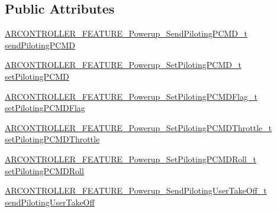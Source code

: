 \subsection*{Public Attributes}
\begin{DoxyCompactItemize}
\item 
\hyperlink{_a_r_c_o_n_t_r_o_l_l_e_r___feature_8h_aedb574521a68246ff02c53d5b0cec072}{A\+R\+C\+O\+N\+T\+R\+O\+L\+L\+E\+R\+\_\+\+F\+E\+A\+T\+U\+R\+E\+\_\+\+Powerup\+\_\+\+Send\+Piloting\+P\+C\+M\+D\+\_\+t} \hyperlink{struct_a_r_c_o_n_t_r_o_l_l_e_r___f_e_a_t_u_r_e___powerup__t_ad61b6fd906830adbf618e84de2c55392}{send\+Piloting\+P\+C\+MD}
\item 
\hyperlink{_a_r_c_o_n_t_r_o_l_l_e_r___feature_8h_a6d878505266b52e9b7facc383fd1db44}{A\+R\+C\+O\+N\+T\+R\+O\+L\+L\+E\+R\+\_\+\+F\+E\+A\+T\+U\+R\+E\+\_\+\+Powerup\+\_\+\+Set\+Piloting\+P\+C\+M\+D\+\_\+t} \hyperlink{struct_a_r_c_o_n_t_r_o_l_l_e_r___f_e_a_t_u_r_e___powerup__t_a0c3d0fba7f677d5554dc5edafea185d1}{set\+Piloting\+P\+C\+MD}
\item 
\hyperlink{_a_r_c_o_n_t_r_o_l_l_e_r___feature_8h_a2281186ac3fd6a5e06dcecd72f15dfdd}{A\+R\+C\+O\+N\+T\+R\+O\+L\+L\+E\+R\+\_\+\+F\+E\+A\+T\+U\+R\+E\+\_\+\+Powerup\+\_\+\+Set\+Piloting\+P\+C\+M\+D\+Flag\+\_\+t} \hyperlink{struct_a_r_c_o_n_t_r_o_l_l_e_r___f_e_a_t_u_r_e___powerup__t_ab0da133fb74867a5ac7f23a9ae5d4bc0}{set\+Piloting\+P\+C\+M\+D\+Flag}
\item 
\hyperlink{_a_r_c_o_n_t_r_o_l_l_e_r___feature_8h_ae4fc8f69ba0f7e4fb4c277dd953cd716}{A\+R\+C\+O\+N\+T\+R\+O\+L\+L\+E\+R\+\_\+\+F\+E\+A\+T\+U\+R\+E\+\_\+\+Powerup\+\_\+\+Set\+Piloting\+P\+C\+M\+D\+Throttle\+\_\+t} \hyperlink{struct_a_r_c_o_n_t_r_o_l_l_e_r___f_e_a_t_u_r_e___powerup__t_aa9a3c347fab0b956d79fb6d1629b2529}{set\+Piloting\+P\+C\+M\+D\+Throttle}
\item 
\hyperlink{_a_r_c_o_n_t_r_o_l_l_e_r___feature_8h_a3c719010b35c76953e0b716555fcd212}{A\+R\+C\+O\+N\+T\+R\+O\+L\+L\+E\+R\+\_\+\+F\+E\+A\+T\+U\+R\+E\+\_\+\+Powerup\+\_\+\+Set\+Piloting\+P\+C\+M\+D\+Roll\+\_\+t} \hyperlink{struct_a_r_c_o_n_t_r_o_l_l_e_r___f_e_a_t_u_r_e___powerup__t_af99ae95e66e73c6d0dcde2c16a310c57}{set\+Piloting\+P\+C\+M\+D\+Roll}
\item 
\hyperlink{_a_r_c_o_n_t_r_o_l_l_e_r___feature_8h_ad80e5d7e14180492b868024b8b972291}{A\+R\+C\+O\+N\+T\+R\+O\+L\+L\+E\+R\+\_\+\+F\+E\+A\+T\+U\+R\+E\+\_\+\+Powerup\+\_\+\+Send\+Piloting\+User\+Take\+Off\+\_\+t} \hyperlink{struct_a_r_c_o_n_t_r_o_l_l_e_r___f_e_a_t_u_r_e___powerup__t_aa246a4ae16e683025d71554e6131c610}{send\+Piloting\+User\+Take\+Off}

\end{DoxyCompactItemize}
